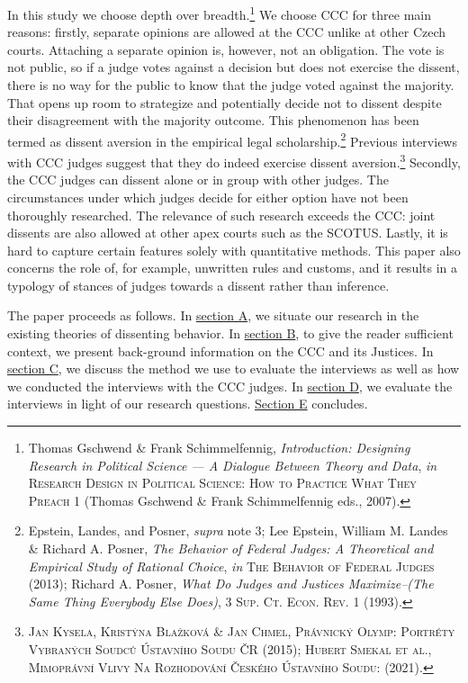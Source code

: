\documentclass[
  11pt,
]{article}
\begin{document}
In this study we choose depth over breadth.\footnote{Thomas Gschwend \& Frank Schimmelfennig, \emph{Introduction: {Designing Research} in {Political Science} --- {A Dialogue} Between {Theory} and {Data}}, \emph{in} \textsc{Research {Design} in {Political Science}: {How} to {Practice What They Preach}} 1 (Thomas Gschwend \& Frank Schimmelfennig eds., 2007).} We choose CCC for three main reasons: firstly, separate opinions are allowed at the CCC unlike at other Czech courts. Attaching a separate opinion is, however, not an obligation. The vote is not public, so if a judge votes against a decision but does not exercise the dissent, there is no way for the public to know that the judge voted against the majority. That opens up room to strategize and potentially decide not to dissent despite their disagreement with the majority outcome. This phenomenon has been termed as dissent aversion in the empirical legal scholarship.\footnote{Epstein, Landes, and Posner, \emph{supra} note 3; Lee Epstein, William M. Landes \& Richard A. Posner, \emph{The {Behavior} of {Federal Judges}: {A Theoretical} and {Empirical Study} of {Rational Choice}}, \emph{in} \textsc{The {Behavior} of {Federal Judges}} (2013); Richard A. Posner, \emph{What {Do Judges} and {Justices Maximize--}({The Same Thing Everybody Else Does})}, 3 \textsc{Sup. Ct. Econ. Rev.} 1 (1993).} Previous interviews with CCC judges suggest that they do indeed exercise dissent aversion.\footnote{\textsc{Jan Kysela, Kristýna Blažková \& Jan Chmel}, \textsc{Právnický {Olymp}: Portréty Vybraných Soudců {Ústavního} Soudu {ČR}} (2015); \textsc{Hubert Smekal et al.}, \textsc{Mimoprávní Vlivy Na Rozhodování Českého {Ústavního} Soudu:} (2021).} Secondly, the CCC judges can dissent alone or in group with other judges. The circumstances under which judges decide for either option have not been thoroughly researched. The relevance of such research exceeds the CCC: joint dissents are also allowed at other apex courts such as the SCOTUS. Lastly, it is hard to capture certain features solely with quantitative methods. This paper also concerns the role of, for example, unwritten rules and customs, and it results in a typology of stances of judges towards a dissent rather than inference.

The paper proceeds as follows. In \hyperref[theory-dissent]{section A}, we situate our research in the existing theories of dissenting behavior. In \hyperref[primer]{section B}, to give the reader sufficient context, we present back-ground information on the CCC and its Justices. In \hyperref[method]{section C}, we discuss the method we use to evaluate the interviews as well as how we conducted the interviews with the CCC judges. In \hyperref[empirics]{section D}, we evaluate the interviews in light of our research questions. \hyperref[conclusion]{Section E} concludes.
\end{document}
